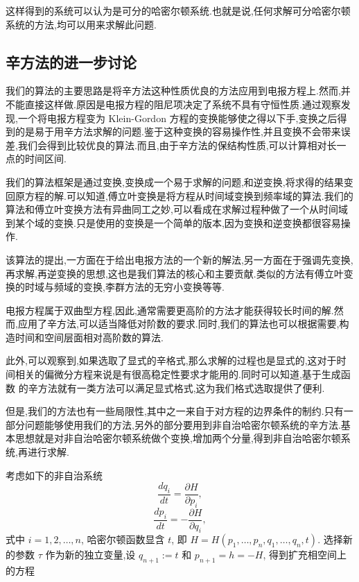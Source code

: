 这样得到的系统可以认为是可分的哈密尔顿系统.也就是说,任何求解可分哈密尔顿系统的方法,均可以用来求解此问题.

\subsection{辛方法的进一步讨论}
我们的算法的主要思路是将辛方法这种性质优良的方法应用到电报方程上.然而,并不能直接这样做.原因是电报方程的阻尼项决定了系统不具有守恒性质.通过观察发现,一个将电报方程变为 Klein-Gordon 方程的变换能够使之得以下手,变换之后得到的是易于用辛方法求解的问题.鉴于这种变换的容易操作性,并且变换不会带来误差,我们会得到比较优良的算法.而且,由于辛方法的保结构性质,可以计算相对长一点的时间区间.

我们的算法框架是通过变换,变换成一个易于求解的问题,和逆变换,将求得的结果变回原方程的解.可以知道,傅立叶变换是将方程从时间域变换到频率域的算法.我们的算法和傅立叶变换方法有异曲同工之妙,可以看成在求解过程种做了一个从时间域到某个域的变换.只是使用的变换是一个简单的版本,因为变换和逆变换都很容易操作.

该算法的提出,一方面在于给出电报方法的一个新的解法,另一方面在于强调先变换,再求解,再逆变换的思想,这也是我们算法的核心和主要贡献.类似的方法有傅立叶变换的时域与频域的变换,李群方法的无穷小变换等等.

电报方程属于双曲型方程,因此,通常需要更高阶的方法才能获得较长时间的解.然而,应用了辛方法,可以适当降低对阶数的要求.同时,我们的算法也可以根据需要,构造时间和空间层面相对高阶数的算法.

此外,可以观察到,如果选取了显式的辛格式,那么求解的过程也是显式的,这对于时间相关的偏微分方程来说是有很高稳定性要求才能用的.同时可以知道,基于生成函数 \cite{feng2010symplectic} 的辛方法就有一类方法可以满足显式格式,这为我们格式选取提供了便利.

但是,我们的方法也有一些局限性,其中之一来自于对方程的边界条件的制约.只有一部分问题能够使用我们的方法,另外的部分要用到非自治哈密尔顿系统的辛方法.基本思想就是对非自治哈密尔顿系统做个变换,增加两个分量,得到非自治哈密尔顿系统,再进行求解.

考虑如下的非自治系统
\begin{equation*}
	\frac{dq_i}{dt}=\frac{\partial H}{\partial p_i},
\end{equation*}
\begin{equation*}
	\frac{dp_i}{dt}=-\frac{\partial H}{\partial q_i},
\end{equation*}
式中 $i=1,2,\ldots,n$, 哈密尔顿函数显含 $t$, 即 $H=H(p_1,\ldots,p_n,q_1,\ldots,q_n,t)$. 选择新的参数 $\tau$ 作为新的独立变量,设 $q_{n+1}:=t$ 和 $p_{n+1}=h=-H$, 得到扩充相空间上的方程

